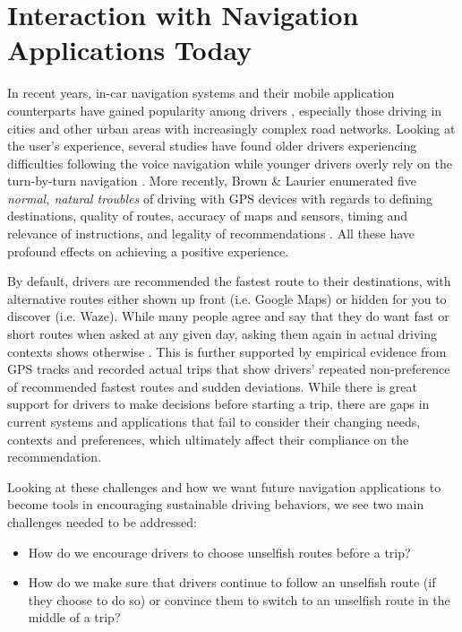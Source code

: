 \section{Interaction with Navigation Applications Today}
In recent years, in-car navigation systems and their mobile application counterparts have gained popularity among drivers \cite{2018GoogleAnnieb, Waze2016DriverIndex}, especially those driving in cities and other urban areas with increasingly complex road networks. Looking at the user's experience, several studies have found older drivers experiencing difficulties following the voice navigation \cite{Dingus1997a,Mahmud2009UserDrivers} while younger drivers overly rely on the turn-by-turn navigation \cite{Mahmud2009UserDrivers}. More recently, Brown \& Laurier enumerated five \emph{normal, natural troubles} of driving with GPS devices with regards to defining destinations, quality of routes, accuracy of maps and sensors, timing and relevance of instructions, and legality of recommendations \cite{Brown2012TheGPS}. All these have profound effects on achieving a positive experience.

By default, drivers are recommended the fastest route to their destinations, with alternative routes either shown up front (i.e. Google Maps) or hidden for you to discover (i.e. Waze). While many people agree and say that they do want fast or short routes when asked at any given day, asking them again in actual driving contexts shows otherwise \cite{Pfleging2014ExperienceNavigation}. This is further supported by empirical evidence from GPS tracks and recorded actual trips that show drivers' repeated non-preference of recommended fastest routes \cite{Quercia2014, Zhu2015DoPrinciple,Tang2016AnalyzingData} and sudden deviations\cite{Fujino2018DetectingTracks,Brown2012TheGPS,Samson:2019:EFI:3290605.3300601}. While there is great support for drivers to make decisions before starting a trip, there are gaps in current systems and applications that fail to consider their changing needs, contexts and preferences, which ultimately affect their compliance on the recommendation.

Looking at these challenges and how we want future navigation applications to become tools in encouraging sustainable driving behaviors, we see two main challenges needed to be addressed:
\begin{itemize}
    \item How do we encourage drivers to choose unselfish routes before a trip?
    \item How do we make sure that drivers continue to follow an unselfish route (if they choose to do so) or convince them to switch to an unselfish route in the middle of a trip?
\end{itemize}

